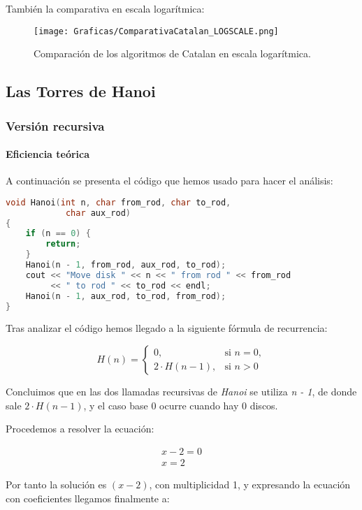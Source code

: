 \documentclass[a4paper,12pt]{article} %
\begin{document}
También la comparativa en escala logarítmica:

\begin{figure}[H]
	\centering
	\texttt{[image: Graficas/ComparativaCatalan\_LOGSCALE.png]}
	\caption{Comparación de los algoritmos de Catalan en escala logarítmica.}
\end{figure}

\subsection{Las Torres de Hanoi}

\subsubsection{Versión recursiva}
\paragraph{Eficiencia teórica}

A continuación se presenta el código que hemos usado para hacer el análisis:

\begin{lstlisting}[language=C, caption={Código de Hanoi}]
void Hanoi(int n, char from_rod, char to_rod,
            char aux_rod)
{
    if (n == 0) {
        return;
    }
    Hanoi(n - 1, from_rod, aux_rod, to_rod);
    cout << "Move disk " << n << " from rod " << from_rod
         << " to rod " << to_rod << endl;
    Hanoi(n - 1, aux_rod, to_rod, from_rod);
}
\end{lstlisting}

Tras analizar el código hemos llegado a la siguiente fórmula de recurrencia:

\[
	H(n)=
	\begin{cases}
		0,             & \text{si } n = 0, \\[6pt]
		2\cdot H(n-1), & \text{si } n > 0
	\end{cases}
\]

Concluimos que en las dos llamadas recursivas de \textit{Hanoi}
se utiliza \textit{n - 1}, de donde sale $2\cdot H(n-1)$, y el caso base
0 ocurre cuando hay 0 discos.

Procedemos a resolver la ecuación:

\begin{align*}
	x - 2 = 0 \\
	x = 2
\end{align*}

Por tanto la solución es $(x -2)$, con multiplicidad 1, y expresando la
ecuación con coeficientes llegamos finalmente a:
\end{document}
